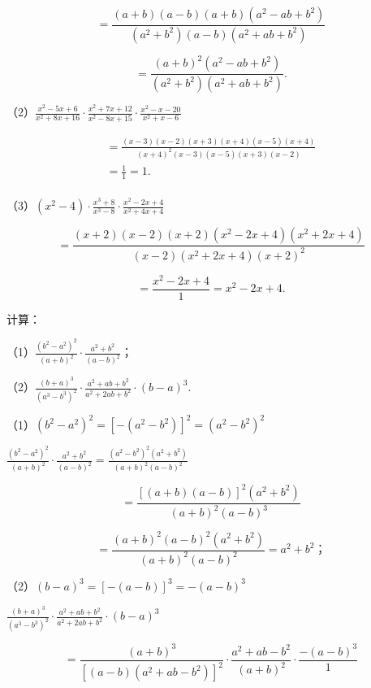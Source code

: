 \[
= \frac{(a + b) (a - b) (a + b) (a ^{2} - a b + b ^{2})}{(a ^{2} + b ^{2}) (a - b) (a ^{2} + a b + b ^{2})}
\]

\[
= \frac{(a + b) ^{2} (a ^{2} - a b + b ^{2})}{(a ^{2} + b ^{2}) (a ^{2} + a b + b ^{2})}.
\]

（2）\(\frac{x^2 - 5x + 6}{x^2 + 8x + 16} \cdot \frac{x^2 + 7x + 12}{x^2 - 8x + 15} \cdot \frac{x^2 - x - 20}{x^2 + x - 6}\)

\[
\begin{array}{l} = \frac{(x - 3) (x - 2) (x + 3) (x + 4) (x - 5) (x + 4)}{(x + 4) ^{2} (x - 3) (x - 5) (x + 3) (x - 2)} \\ = \frac{1}{1} = 1. \\ \end{array}
\]

（3）\((x^{2} - 4)\cdot \frac{x^{3} + 8}{x^{3} - 8}\cdot \frac{x^{2} - 2x + 4}{x^{2} + 4x + 4}\)

\[
= \frac{(x + 2) (x - 2) (x + 2) \left(x ^{2} - 2 x + 4\right) \left(x ^{2} + 2 x + 4\right)}{(x - 2) \left(x ^{2} + 2 x + 4\right) (x + 2) ^{2}}
\]

\[
= \frac{x ^{2} - 2 x + 4}{1} = x ^{2} - 2 x + 4.
\]

 计算：

（1）\(\frac{(b^2 - a^2)^2}{(a + b)^2} \cdot \frac{a^2 + b^2}{(a - b)^2}\)；

（2）\(\frac{(b + a)^3}{(a^3 - b^3)^2} \cdot \frac{a^2 + ab + b^2}{a^2 + 2ab + b^2} \cdot (b - a)^3.\)

（1）\((b^{2} - a^{2})^{2} = [-(a^{2} - b^{2})]^{2} = (a^{2} - b^{2})^{2}\)

\(\frac{(b^2 - a^2)^2}{(a + b)^2} \cdot \frac{a^2 + b^2}{(a - b)^2} = \frac{(a^2 - b^2)^2(a^2 + b^2)}{(a + b)^2(a - b)^2}\)

\[
= \frac{\left[ (a + b) (a - b) \right] ^{2} (a ^{2} + b ^{2})}{(a + b) ^{2} (a - b) ^{3}}
\]

\[
= \frac{(a + b) ^{2} (a - b) ^{2} (a ^{2} + b ^{2})}{(a + b) ^{2} (a - b) ^{2}} = a ^{2} + b ^{2}\text{；}
\]

 （2）\((b - a)^{3} = [-(a - b)]^{3} = -(a - b)^{3}\)

\(\frac{(b + a)^3}{(a^3 - b^3)^2} \cdot \frac{a^2 + ab + b^2}{a^2 + 2ab + b^2} \cdot (b - a)^3\)

\[
= \frac{(a + b) ^{3}}{\left[ (a - b) (a ^{2} + a b - b ^{2}) \right] ^{2}} \cdot \frac{a ^{2} + a b - b ^{2}}{(a + b) ^{2}} \cdot \frac{- (a - b) ^{3}}{1}
\]

